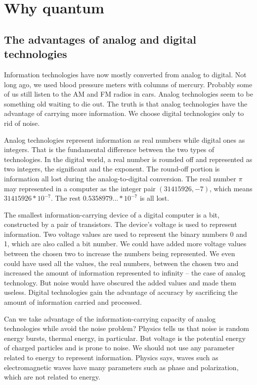 \documentclass[oneside, letter, 12pt]{book}
\begin{document}
\section{Why quantum}
\subsection{The advantages of analog and digital technologies}
Information technologies have now mostly converted from analog to digital. Not long ago, we used blood pressure meters with columns of mercury. Probably some of us still listen to the AM and FM radios in cars. Analog technologies seem to be something old waiting to die out. The truth is that analog technologies have the advantage of carrying more information. We choose digital technologies only to rid of noise.

Analog technologies represent information as real numbers while digital ones as integers. That is the fundamental difference between the two types of technologies. In the digital world, a real number is rounded off and represented as two integers, the significant and the exponent. The round-off portion is information all lost during the analog-to-digital conversion. The real number $\pi$ may represented in a computer as the integer pair $(31415926, -7)$, which means $31415926*10^{-7}$. The rest $0.5358979...*10^{-7}$ is all lost.

The smallest information-carrying device of a digital computer is a bit, constructed by a pair of transistors. The device's voltage is used to represent information. Two voltage values are used to represent the binary numbers 0 and 1, which are also called a bit number. We could have added more voltage values between the chosen two to increase the numbers being represented. We even could have used all the values, the real numbers, between the chosen two and increased the amount of information represented to infinity -- the case of analog technology. But noise would have obscured the added values and made them useless. Digital technologies gain the advantage of accuracy by sacrificing the amount of information carried and processed. 

Can we take advantage of the information-carrying capacity of analog technologies while avoid the noise problem? Physics tells us that noise is random energy bursts, thermal energy, in particular. But voltage is the potential energy of charged particles and is prone to noise. We should not use any parameter related to energy to represent information. Physics says, waves such as electromagnetic waves have many parameters such as phase and polarization, which are not related to energy.
\end{document}
